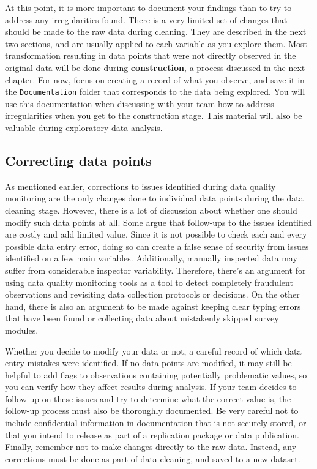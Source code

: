 At this point, it is more important to document your findings
than to try to address any irregularities found.
There is a very limited set of changes that should be made to the raw data during cleaning.
They are described in the next two sections,
and are usually applied to each variable as you explore them.
Most transformation resulting in data points that were not directly observed in the original data
will be done during \textbf{construction}, a process discussed in the next chapter.
For now, focus on creating a record of what you observe,
and save it in the \texttt{Documentation} folder that corresponds to the data being explored.
You will use this documentation when discussing with your team
how to address irregularities when you get to the construction stage.
This material will also be valuable during exploratory data analysis.

\subsection{Correcting data points}

As mentioned earlier, 
corrections to issues identified during data quality monitoring are
the only changes done to individual data points during the data cleaning stage.
However, there is a lot of discussion about whether one should modify such data points at all.
Some argue that follow-ups to the issues identified are costly and add limited value.
Since it is not possible to check each and every possible data entry error,
doing so can create a false sense of security from issues identified on a few main variables. 
Additionally, manually inspected data may suffer from considerable inspector variability.
Therefore, there's an argument for using data quality monitoring tools
as a tool to detect completely fraudulent observations and
revisiting data collection protocols or decisions.
On the other hand, there is also an argument to be made
against keeping clear typing errors that have been found or
collecting data about mistakenly skipped survey modules.

Whether you decide to modify your data or not,
a careful record of which data entry mistakes were identified.
If no data points are modified, 
it may still be helpful to add flags to observations containing
potentially problematic values,
so you can verify how they affect results during analysis.
If your team decides to follow up on these issues and 
try to determine what the correct value is,
the follow-up process must also be thoroughly documented.
Be very careful not to include confidential information in documentation that is not securely stored,
or that you intend to release as part of a replication package or data publication.
Finally, remember not to make changes directly to the raw data.
Instead, any corrections must be done as part of data cleaning,
and saved to a new dataset.

